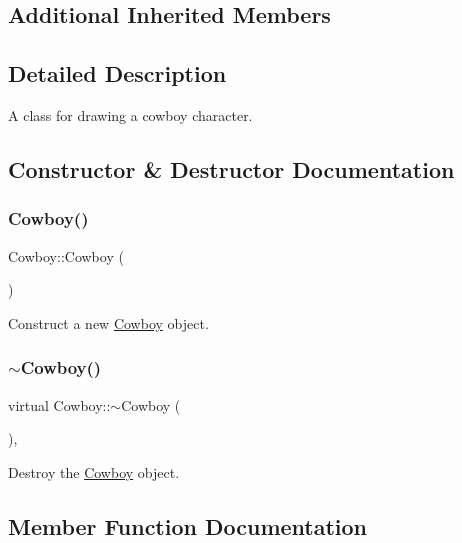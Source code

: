\subsection*{Additional Inherited Members}


\subsection{Detailed Description}
A class for drawing a cowboy character. 



\subsection{Constructor \& Destructor Documentation}
\mbox{\label{classCowboy_ae2972a731f41aea03b97b7814f1ec6d0}} 
\subsubsection{\texorpdfstring{Cowboy()}{Cowboy()}}
{\footnotesize\ttfamily Cowboy\+::\+Cowboy (\begin{DoxyParamCaption}{ }\end{DoxyParamCaption})}



Construct a new \mbox{\hyperlink{classCowboy}{Cowboy}} object. 

\mbox{\label{classCowboy_a2a82f675073318efefd3a0f6c297fe08}} 
\subsubsection{\texorpdfstring{$\sim$Cowboy()}{~Cowboy()}}
{\footnotesize\ttfamily virtual Cowboy\+::$\sim$\+Cowboy (\begin{DoxyParamCaption}{ }\end{DoxyParamCaption})\hspace{0.3cm}{\ttfamily [virtual]}, {\ttfamily [default]}}



Destroy the \mbox{\hyperlink{classCowboy}{Cowboy}} object. 



\subsection{Member Function Documentation}
\mbox{\label{classCowboy_af7e8a3e9cdcd9054b63a3661ca3f69a6}} 
